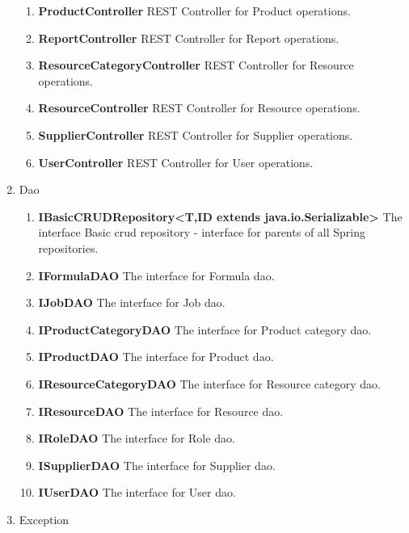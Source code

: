 \documentclass[a4paper,11pt,twoside]{report}
\theoremstyle{definition}
\begin{document}
\begin{enumerate}
\begin{enumerate}
\item \textbf{ProductController} REST Controller for Product operations.
\item \textbf{ReportController} REST Controller for Report operations.
\item \textbf{ResourceCategoryController} REST Controller for Resource operations.
\item \textbf{ResourceController} REST Controller for Resource operations.
\item \textbf{SupplierController} REST Controller for Supplier operations.
\item \textbf{UserController} REST Controller for User operations.

\end{enumerate} 

\item Dao 
\begin{enumerate} 
\item \textbf{IBasicCRUDRepository<T,ID extends java.io.Serializable>} The interface
    Basic crud repository - interface for parents of all Spring repositories.
\item \textbf{IFormulaDAO} The interface for Formula dao.
\item \textbf{IJobDAO} The interface for Job dao.

\item \textbf{IProductCategoryDAO} The interface for Product category dao.
\item \textbf{IProductDAO} The interface for Product dao.
\item \textbf{IResourceCategoryDAO} The interface for Resource category dao.
\item \textbf{IResourceDAO} The interface for Resource dao.

\item \textbf{IRoleDAO} The interface for Role dao.

\item \textbf{ISupplierDAO} The interface for Supplier dao.
\item \textbf{IUserDAO} The interface for User dao.

\end{enumerate} 
\item Exception 
\begin{enumerate} 


\end{enumerate}
\end{enumerate}
\end{document}
